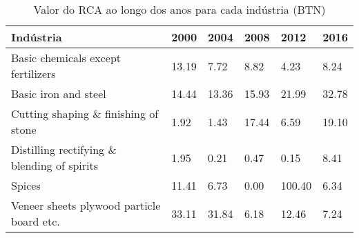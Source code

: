 \begin{table}
\centering
\caption{Valor do RCA ao longo dos anos para cada indústria (BTN)}
\begin{tabular}{p{6cm}p{1.5cm}p{1.5cm}p{1.5cm}p{1.5cm}p{1.5cm}}
\toprule
                                  Indústria &  2000 &  2004 &  2008 &   2012 &  2016 \\
\midrule
         Basic chemicals except fertilizers & 13.19 &  7.72 &  8.82 &   4.23 &  8.24 \\
                       Basic iron and steel & 14.44 & 13.36 & 15.93 &  21.99 & 32.78 \\
       Cutting shaping \& finishing of stone &  1.92 &  1.43 & 17.44 &   6.59 & 19.10 \\
Distilling rectifying \& blending of spirits &  1.95 &  0.21 &  0.47 &   0.15 &  8.41 \\
                                     Spices & 11.41 &  6.73 &  0.00 & 100.40 &  6.34 \\
  Veneer sheets plywood particle board etc. & 33.11 & 31.84 &  6.18 &  12.46 &  7.24 \\
\bottomrule
\end{tabular}
\end{table}
